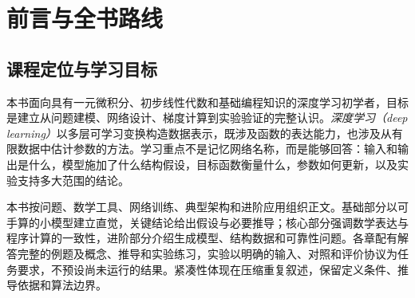 \chapter*{前言与全书路线}

\section*{课程定位与学习目标}
本书面向具有一元微积分、初步线性代数和基础编程知识的深度学习初学者，目标是建立从问题建模、网络设计、梯度计算到实验验证的完整认识。\emph{深度学习（deep learning）}以多层可学习变换构造数据表示，既涉及函数的表达能力，也涉及从有限数据中估计参数的方法。学习重点不是记忆网络名称，而是能够回答：输入和输出是什么，模型施加了什么结构假设，目标函数衡量什么，参数如何更新，以及实验支持多大范围的结论。

本书按问题、数学工具、网络训练、典型架构和进阶应用组织正文。基础部分以可手算的小模型建立直觉，关键结论给出假设与必要推导；核心部分强调数学表达与程序计算的一致性，进阶部分介绍生成模型、结构数据和可靠性问题。各章配有解答完整的例题及概念、推导和实验练习，实验以明确的输入、对照和评价协议为任务要求，不预设尚未运行的结果。紧凑性体现在压缩重复叙述，保留定义条件、推导依据和算法边界。

